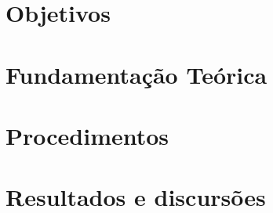\section{Objetivos}

\section{Fundamentação Teórica}

\section{Procedimentos}

\section{Resultados e discursões}